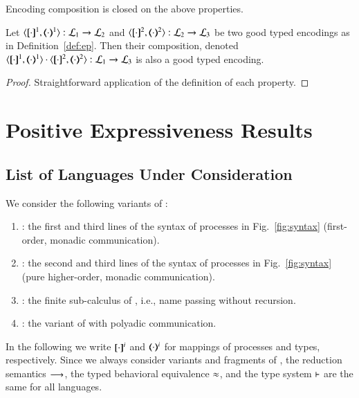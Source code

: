Encoding composition is closed on the above properties.

\begin{proposition}
	Let $\encod{\cdot}{\cdot}{1}: \tyl{L}_1 \to \tyl{L}_2$ and $\encod{\cdot}{\cdot}{2}: \tyl{L}_2 \to \tyl{L}_3$
	be two good typed encodings as in Definition~\ref{def:ep}.
	Then their composition, denoted 
	$\encod{\cdot}{\cdot}{1} \cdot \encod{\cdot}{\cdot}{2}: \tyl{L}_1 \to \tyl{L}_3$
	is also a good typed encoding.
\end{proposition}

\begin{proof}
	Straightforward application of the definition of each property.
\end{proof}

\section{Positive Expressiveness Results}

\subsection{List of Languages Under Consideration}
We consider the following variants of \HOp:
\begin{enumerate}[-]
\item \sesp: the first and third lines of the syntax of processes in Fig.~\ref{fig:syntax} (first-order, monadic communication).
\item \HO: the second and third lines of the syntax of processes in Fig.~\ref{fig:syntax} (pure higher-order, monadic communication).
\item \sespnr: the finite sub-calculus of \sesp, i.e., name passing without recursion.
\item \psesp: the variant of \sesp with polyadic communication.
\end{enumerate}
\noindent
In the following we write $[\!\![\cdot]\!\!]^i$
and $(\!\!\langle\cdot\rangle\!\!)^i$ 
for mappings of processes and types, respectively.
Since we always consider variants and fragments of \HOp, the 
 reduction semantics $\longrightarrow$, the typed behavioral equivalence $\approx$, and the type system $\vdash$ are the same for all languages.

